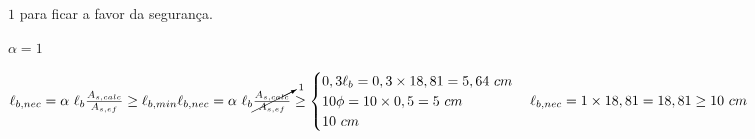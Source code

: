 \begin{resposta}
\begin{enumerate}[start=9]
\begin{enumerate}
            \begin{observacao}
                $1$ para ficar a favor da segurança.
            \end{observacao}

            $\alpha = 1$ \cite[item 9.4.2.5]{nbr6118} \newline

            $\ell_{b,nec} = \alpha\ \ell_b \frac{A_{s,calc}}{A_{s,ef}} \geq  \ell_{b,min} \newline \ell_{b,nec} = \alpha\ \ell_b \cancelto{1}{\frac{A_{s,calc}}{A_{s,ef}}} \geq \begin{cases}
                0,3 \ell_b = 0,3 \times 18,81 = 5,64 \ cm \\
                10\phi = 10 \times 0,5 = 5 \ cm \\
                10 \ cm
            \end{cases} \newline \ell_{b,nec} = 1 \times 18,81 = 18,81 \geq 10 \ cm$
        \end{enumerate}
        
        
        
        
    \end{enumerate}
\end{resposta}
